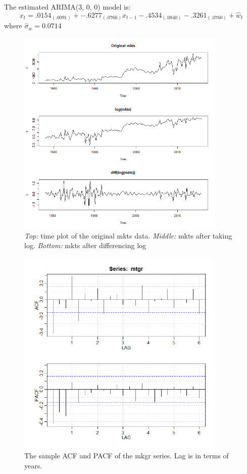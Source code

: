The estimated ARIMA(3, 0, 0) model is:
\begin{equation}
x_t = .0154_{(.0091)} + -.6277_{(.0766)} x_{t-1} -.4534_{(.0840)}- .3261_{(.0760)} + \hat{w}_t
\end{equation}
where $\hat{\sigma}_w = 0.0714$
\begin{figure}
	\centering
	\includegraphics[width=10cm]{Figures/Problem1_mkts}
	\caption{\emph{Top:} time plot of the original mkts data. \emph{Middle:} mkts after taking log. \emph{Bottom:} mkts after differencing log}
	\label{fig:mkts}
\end{figure}
\begin{figure}
	\centering
	\includegraphics[width=10cm]{Figures/Problem1_acf}
	\caption{The sample ACF and PACF of the mkgr series. Lag is in terms of years.}
	\label{fig:acf}
\end{figure}
